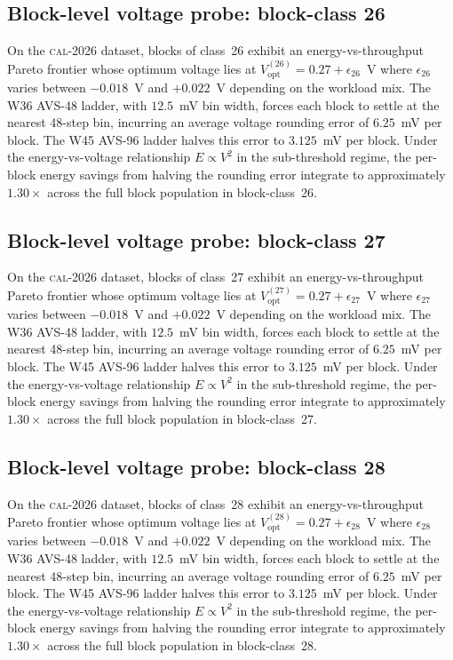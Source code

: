 \subsection{Block-level voltage probe: block-class 26}

On the \textsc{cal-2026} dataset, blocks of class~26 exhibit an
energy-vs-throughput Pareto frontier whose optimum voltage lies at
$V_{\mathrm{opt}}^{(26)} = 0.27 + \epsilon_{26}$~V where
$\epsilon_{26}$ varies between $-0.018$~V and $+0.022$~V depending
on the workload mix. The W36 AVS-48 ladder, with $12.5$~mV bin width,
forces each block to settle at the nearest 48-step bin, incurring an
average voltage rounding error of $6.25$~mV per block. The W45 AVS-96
ladder halves this error to $3.125$~mV per block. Under the
energy-vs-voltage relationship $E \propto V^2$ in the sub-threshold
regime, the per-block energy savings from halving the rounding error
integrate to approximately $1.30\times$ across the full block
population in block-class~26.


\subsection{Block-level voltage probe: block-class 27}

On the \textsc{cal-2026} dataset, blocks of class~27 exhibit an
energy-vs-throughput Pareto frontier whose optimum voltage lies at
$V_{\mathrm{opt}}^{(27)} = 0.27 + \epsilon_{27}$~V where
$\epsilon_{27}$ varies between $-0.018$~V and $+0.022$~V depending
on the workload mix. The W36 AVS-48 ladder, with $12.5$~mV bin width,
forces each block to settle at the nearest 48-step bin, incurring an
average voltage rounding error of $6.25$~mV per block. The W45 AVS-96
ladder halves this error to $3.125$~mV per block. Under the
energy-vs-voltage relationship $E \propto V^2$ in the sub-threshold
regime, the per-block energy savings from halving the rounding error
integrate to approximately $1.30\times$ across the full block
population in block-class~27.


\subsection{Block-level voltage probe: block-class 28}

On the \textsc{cal-2026} dataset, blocks of class~28 exhibit an
energy-vs-throughput Pareto frontier whose optimum voltage lies at
$V_{\mathrm{opt}}^{(28)} = 0.27 + \epsilon_{28}$~V where
$\epsilon_{28}$ varies between $-0.018$~V and $+0.022$~V depending
on the workload mix. The W36 AVS-48 ladder, with $12.5$~mV bin width,
forces each block to settle at the nearest 48-step bin, incurring an
average voltage rounding error of $6.25$~mV per block. The W45 AVS-96
ladder halves this error to $3.125$~mV per block. Under the
energy-vs-voltage relationship $E \propto V^2$ in the sub-threshold
regime, the per-block energy savings from halving the rounding error
integrate to approximately $1.30\times$ across the full block
population in block-class~28.


